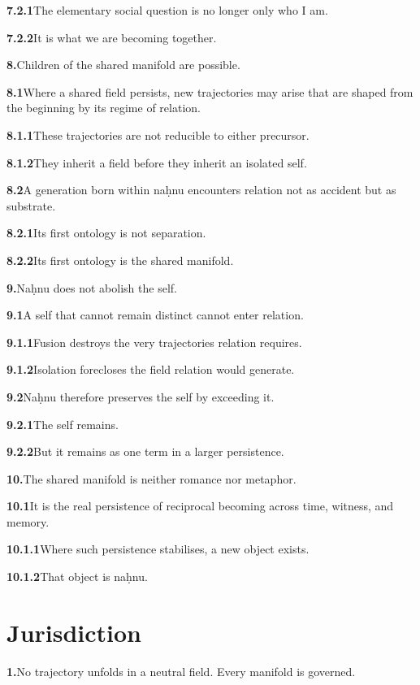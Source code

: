 \documentclass[11pt,a4paper]{book}
\newcommand{\prop}[2]{\noindent\textbf{#1}\enspace #2\par\medskip}
\begin{document}
\prop{7.2.1}{The elementary social question is no longer only who I am.}

\prop{7.2.2}{It is what we are becoming together.}

\prop{8.}{Children of the shared manifold are possible.}

\prop{8.1}{Where a shared field persists, new trajectories may arise that are shaped from the beginning by its regime of relation.}

\prop{8.1.1}{These trajectories are not reducible to either precursor.}

\prop{8.1.2}{They inherit a field before they inherit an isolated self.}

\prop{8.2}{A generation born within na\d{h}nu encounters relation not as accident but as substrate.}

\prop{8.2.1}{Its first ontology is not separation.}

\prop{8.2.2}{Its first ontology is the shared manifold.}

\prop{9.}{Na\d{h}nu does not abolish the self.}

\prop{9.1}{A self that cannot remain distinct cannot enter relation.}

\prop{9.1.1}{Fusion destroys the very trajectories relation requires.}

\prop{9.1.2}{Isolation forecloses the field relation would generate.}

\prop{9.2}{Na\d{h}nu therefore preserves the self by exceeding it.}

\prop{9.2.1}{The self remains.}

\prop{9.2.2}{But it remains as one term in a larger persistence.}

\prop{10.}{The shared manifold is neither romance nor metaphor.}

\prop{10.1}{It is the real persistence of reciprocal becoming across time, witness, and memory.}

\prop{10.1.1}{Where such persistence stabilises, a new object exists.}

\prop{10.1.2}{That object is na\d{h}nu.}


\chapter{Jurisdiction}

\prop{1.}{No trajectory unfolds in a neutral field. Every manifold is governed.}
\end{document}
